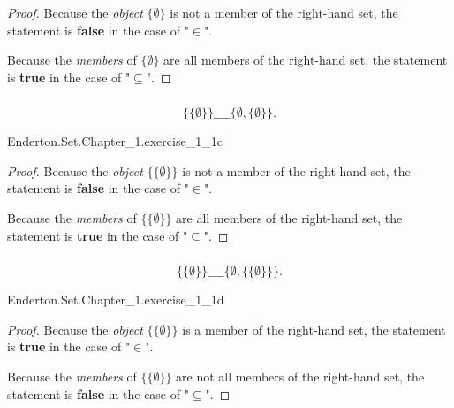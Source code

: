 \documentclass{report}
\begin{document}
  \begin{proof}
    Because the \textit{object} $\{\emptyset\}$ is not a member of the
      right-hand set, the statement is \textbf{false} in the case of "$\in$".

    Because the \textit{members} of $\{\emptyset\}$ are all members of the
      right-hand set, the statement is \textbf{true} in the case of
      "$\subseteq$".
  \end{proof}

\subsubsection{}%

  $$\{\{\emptyset\}\} \_\_\_\_ \{\emptyset, \{\emptyset\}\}.$$

    {Enderton.Set.Chapter\_1.exercise\_1\_1c}

  \begin{proof}
    Because the \textit{object} $\{\{\emptyset\}\}$ is not a member of the
      right-hand set, the statement is \textbf{false} in the case of "$\in$".

    Because the \textit{members} of $\{\{\emptyset\}\}$ are all members of the
      right-hand set, the statement is \textbf{true} in the case of
      "$\subseteq$".
  \end{proof}

\subsubsection{}%

  $$\{\{\emptyset\}\} \_\_\_\_ \{\emptyset, \{\{\emptyset\}\}\}.$$

    {Enderton.Set.Chapter\_1.exercise\_1\_1d}

  \begin{proof}
    Because the \textit{object} $\{\{\emptyset\}\}$ is a member of the
      right-hand set, the statement is \textbf{true} in the case of "$\in$".

    Because the \textit{members} of $\{\{\emptyset\}\}$ are not all members of
      the right-hand set, the statement is \textbf{false} in the case of
      "$\subseteq$".
  \end{proof}

\subsubsection{}%
\end{document}
